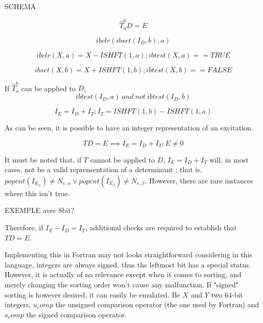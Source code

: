 \documentclass[./thesis.tex]{subfiles}
\begin{document}
SCHEMA


\begin{equation}
\hat T_{a}^{b} D = E
\end{equation}

\begin{equation}
ibclr(ibset(I_D, b), a)
\end{equation}
 
 
\begin{equation}
ibclr(X, a) = X - ISHFT(1,a) ; ibtest(X,a) == TRUE
\end{equation}

\begin{equation}
ibset(X, b) = X + ISHFT(1,b) ; ibtest(X,b) == FALSE
\end{equation}

If $\hat T_{a}^b$ can be applied to $D$, 
\begin{equation}
ibtest(I_D,a)\ and\ not\ ibtest(I_D,b)
\end{equation}

\begin{equation}
I_E = I_D + I_T ; I_T = ISHFT(1,b) - ISHFT(1,a)
\end{equation}

As can be seen, it is possible to have an integer representation of an excitation.

\begin{equation}
TD = E \implies I_E = I_D + I_T ; E \neq 0
\end{equation}

It must be noted that, if $T$ cannot be applied to $D$, $I_E = I_D + I_T$ will, in most cases, not be a valid reprensentation of a determinant ; that is, $popcnt(I_{E_\alpha}) \neq N_{e,\alpha} \vee popcnt(I_{E_\beta}) \neq N_{e,\beta}$. However, there are rare instances where this isn't true.

EXEMPLE avec 8bit?

Therefore, if $I_E - I_D = I_T$, additional checks are required to establish that $TD = E$.


Implementing this in Fortran may not looks straightforward considering in this language, integers are always signed, thus the leftmost bit has a special status. However, it is actually of no relevance except when it comes to sorting, and merely changing the sorting order won't cause any malfunction.
If "signed" sorting is however desired, it can easily be emulated. Be $X$ and $Y$ two 64-bit integers, $u_comp$ the unsigned comparison operator (the one used by Fortran) and $s_comp$ the signed comparison operator.
\end{document}
